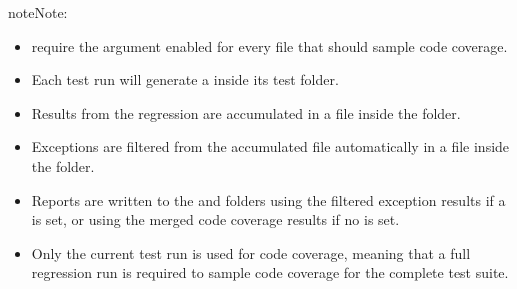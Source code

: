 \documentclass[letterpaper,10pt,english]{sphinxmanual}
\begin{document}
\begin{sphinxadmonition}{note}{Note:}\begin{itemize}
\item {} 
\sphinxAtStartPar
{\hyperref[\detokenize{api:add-files}]{}} require the  argument enabled for every file that should sample code coverage.

\item {} 
\sphinxAtStartPar
Each test run will generate a  inside its test folder.

\item {} 
\sphinxAtStartPar
Results from the regression are accumulated in a   file inside the
 folder.

\item {} 
\sphinxAtStartPar
Exceptions are filtered from the accumulated file automatically in a   file
inside the  folder.

\item {} 
\sphinxAtStartPar
Reports are written to the  and  folders using the filtered
exception results if a  is set, or using the merged code coverage results if no  is set.

\item {} 
\sphinxAtStartPar
Only the current test run is used for code coverage, meaning that a full regression run is required to sample
code coverage for the complete test suite.

\end{itemize}
\end{sphinxadmonition}

\sphinxAtStartPar
{}

\begin{sphinxVerbatim}[commandchars=\\\{\}]
 

  
\end{sphinxVerbatim}
\end{document}

